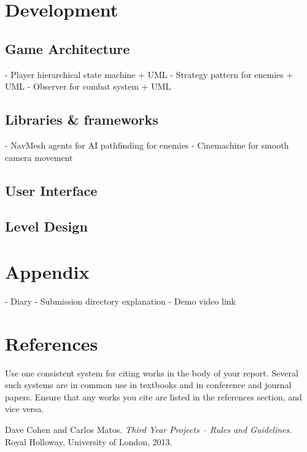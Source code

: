 \documentclass[]{final_report}
\begin{document}
\chapter{Development}
\section{Game Architecture}
- Player hierarchical state machine + UML \newline
- Strategy pattern for enemies + UML \newline
- Observer for combat system + UML \newline
\section{Libraries \& frameworks}
- NavMesh agents for AI pathfinding for enemies \newline
- Cinemachine for smooth camera movement \newline
\section{User Interface}
\section{Level Design}

\chapter{Appendix}
- Diary \newline
- Submission directory explanation \newline
- Demo video link\newline
\chapter{References}

Use one consistent system for citing works in the body of your report. Several such systems are in common use in textbooks and in conference and journal papers. Ensure that any works you cite are listed in the references section, and vice versa. 

\newpage
\begin{thebibliography}{99}
 Dave Cohen and Carlos Matos. \emph{Third Year Projects -- Rules and Guidelines}. Royal Holloway, University of London, 2013.
\end{thebibliography}
\label{endpage}
\end{document}
